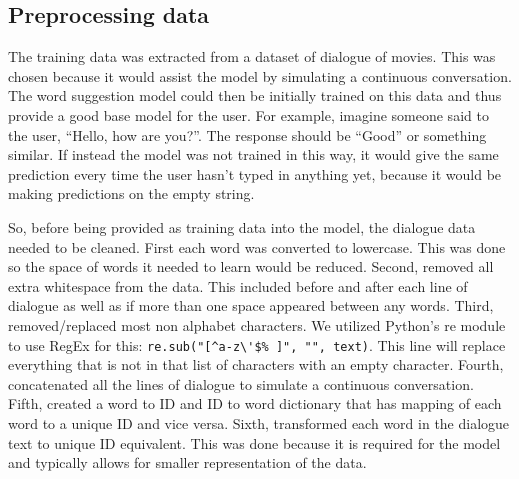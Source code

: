 \documentclass[sigconf]{acmart}
\begin{document}
\subsection{Preprocessing data}
The training data was extracted from a dataset of dialogue of movies. This was chosen because it would assist the model by simulating a continuous conversation. The word suggestion model could then be initially trained on this data and thus provide a good base model for the user. For example, imagine someone said to the user, “Hello, how are you?”. The response should be “Good” or something similar. If instead the model was not trained in this way, it would give the same prediction every time the user hasn’t typed in anything yet, because it would be making predictions on the empty string. 

So, before being provided as training data into the model, the dialogue data needed to be cleaned. First each word was converted to lowercase. This was done so the space of words it needed to learn would be reduced. Second, removed all extra whitespace from the data. This included before and after each line of dialogue as well as if more than one space appeared between any words. Third, removed/replaced most non alphabet characters. We utilized Python’s re module to use RegEx for this: \lstinline{re.sub("[^a-z\'$% ]", "", text)}. This line will replace everything that is not in that list of characters with an empty character. Fourth, concatenated all the lines of dialogue to simulate a continuous conversation. Fifth, created a word to ID and ID to word dictionary that has mapping of each word to a unique ID and vice versa. Sixth, transformed each word in the dialogue text to unique ID equivalent. This was done because it is required for the model and typically allows for smaller representation of the data.
\end{document}
